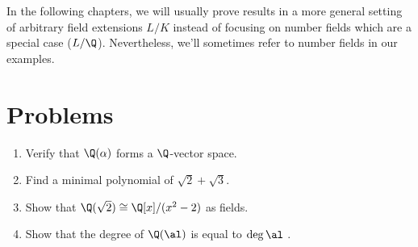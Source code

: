 In the following chapters, we will usually prove results in a more general setting
of arbitrary field extensions $L/K$ instead of focusing on number fields which are a special case ($L/\Q$).
Nevertheless, we'll sometimes refer to number fields in our examples.

\section{Problems}
\begin{enumerate}
    \item Verify that $\Q(\alpha)$ forms a $\Q$-vector space.
    \item Find a minimal polynomial of $\sqrt{2} + \sqrt{3}$.
    \item Show that $\Q(\sqrt{2}) \cong \Q[x]/(x^2 - 2)$ as fields.
    \item Show that the degree of $\Q(\al)$ is equal to $\deg \al$ .
\end{enumerate}
